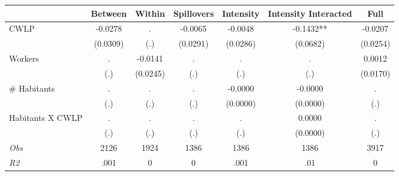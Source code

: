 \begin{tabular}{l*{6}{c}}\hline&\multicolumn{1}{c}{Between}&\multicolumn{1}{c}{Within}&\multicolumn{1}{c}{Spillovers}&\multicolumn{1}{c}{Intensity}&\multicolumn{1}{c}{Intensity Interacted}&\multicolumn{1}{c}{Full}\\ \hline 
CWLP & -0.0278 & . & -0.0065 & -0.0048 & -0.1432** & -0.0207 \\
 & (0.0309) & (.) & (0.0291) & (0.0286) & (0.0682) & (0.0254) \\
Workers & . & -0.0141 & . & . & . & 0.0012 \\
 & (.) & (0.0245) & (.) & (.) & (.) & (0.0170) \\
\# Habitants & . & . & . & -0.0000 & -0.0000 & . \\
 & (.) & (.) & (.) & (0.0000) & (0.0000) & (.) \\
Habitants X CWLP & . & . & . & . & 0.0000 & . \\
 & (.) & (.) & (.) & (.) & (0.0000) & (.) \\
\hline \textit{Obs} & 2126 & 1924 & 1386 & 1386 & 1386 & 3917 \\ \textit{R2} & .001 & 0 & 0 & .001 & .01 & 0 \\ \hline \end{tabular}
